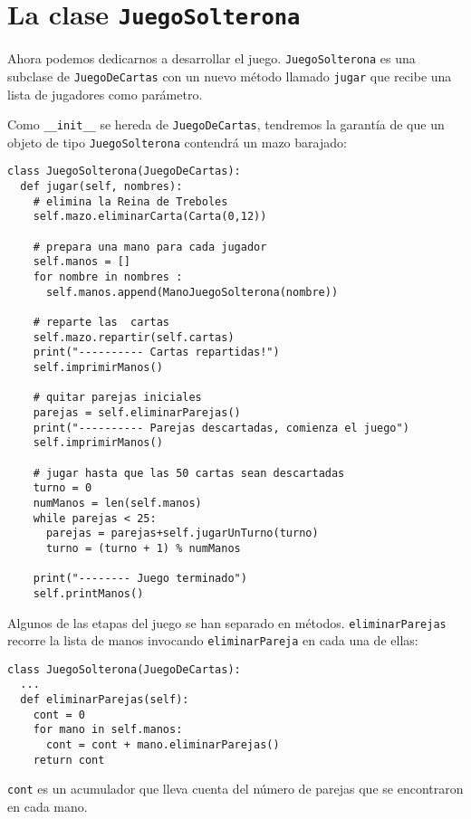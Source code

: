 \section{La clase \texttt{JuegoSolterona}}


Ahora podemos dedicarnos a desarrollar el juego. \texttt{JuegoSolterona}
es una subclase de \texttt{JuegoDeCartas} con un nuevo método llamado
\texttt{jugar} que recibe una lista de jugadores como parámetro.

Como \texttt{\_\_init\_\_} se hereda de \texttt{JuegoDeCartas}, tendremos
la garantía de que un objeto de tipo \texttt{JuegoSolterona} contendrá
un mazo barajado:

\begin{verbatim}
class JuegoSolterona(JuegoDeCartas):
  def jugar(self, nombres):
    # elimina la Reina de Treboles
    self.mazo.eliminarCarta(Carta(0,12))

    # prepara una mano para cada jugador
    self.manos = []
    for nombre in nombres :
      self.manos.append(ManoJuegoSolterona(nombre))

    # reparte las  cartas
    self.mazo.repartir(self.cartas)
    print("---------- Cartas repartidas!")
    self.imprimirManos()

    # quitar parejas iniciales
    parejas = self.eliminarParejas()
    print("---------- Parejas descartadas, comienza el juego")
    self.imprimirManos()

    # jugar hasta que las 50 cartas sean descartadas
    turno = 0
    numManos = len(self.manos)
    while parejas < 25:
      parejas = parejas+self.jugarUnTurno(turno)
      turno = (turno + 1) % numManos

    print("-------- Juego terminado")
    self.printManos()
\end{verbatim}
 Algunos de las etapas del juego se han separado en métodos. \texttt{eliminarParejas}
recorre la lista de manos invocando \texttt{eliminarPareja} en cada
una de ellas:
\begin{verbatim}
class JuegoSolterona(JuegoDeCartas):
  ...
  def eliminarParejas(self):
    cont = 0
    for mano in self.manos:
      cont = cont + mano.eliminarParejas()
    return cont
\end{verbatim}

\texttt{cont} es un acumulador que lleva cuenta del número de parejas
que se encontraron en cada mano.


